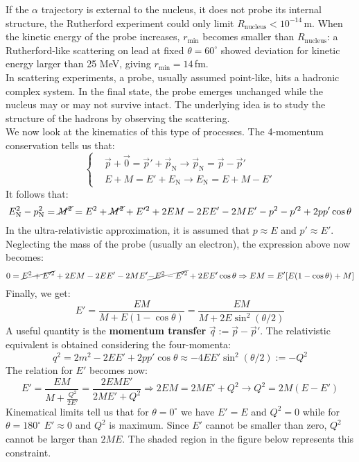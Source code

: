\documentclass[10.75pt,a4paper,openright,bottom=2cm]{article}
\begin{document}
If the $\alpha$ trajectory is external to the nucleus, it does not probe its internal structure, the Rutherford experiment could only limit $R_{\text{nucleus}}<10^{-14}$\,m. When the kinetic energy of the probe increases, $r_{\min}$ becomes smaller than $R_{\text{nucleus}}$: a Rutherford-like scattering on lead at fixed $\theta=60^\circ$ showed deviation for kinetic energy larger than 25 MeV, giving $r_{\min}=14$\,fm.\\
In scattering experiments, a probe, usually assumed point-like, hits a hadronic complex system. In the final state, the probe emerges unchanged while the nucleus may or may not survive intact. The underlying idea is to study the structure of the hadrons by observing the scattering.\\
We now look at the kinematics of this type of processes. The 4-momentum conservation tells us that:
\[
\left\{
\begin{aligned}
&\Vec{p}+\Vec{0}=\Vec{p}'+\Vec{p}_{\text{N}}\to\Vec{p}_{\text{N}}=\Vec{p}-\Vec{p}'\\
&E+M=E'+E_{\text{N}}\to E_{\text{N}}=E+M-E'
\end{aligned}
\right.
\]
It follows that:
\[
E_{\text{N}}^2-p_{\text{N}}^2=\cancel{M^2}=E^2+\cancel{M^2}+E'^2+2EM-2EE'-2ME'-p^2-p'^2+2pp'\cos\theta
\]
In the ultra-relativistic approximation, it is assumed that $p\approx E$ and $p'\approx E'$. Neglecting the mass of the probe (usually an electron), the expression above now becomes:
\[
0=\cancel{E^2+E'^2}+2EM-2EE'-2ME'\cancel{-E^2-E'^2}+2EE'\cos\theta\Rightarrow EM=E'[E(1-\cos\theta)+M]
\]
Finally, we get:
\[
E'=\frac{EM}{M+E(1-\cos\theta)}=\frac{EM}{M+2E\sin^2(\theta/2)}
\]
A useful quantity is the \textbf{momentum transfer} $\Vec{q}:=\Vec{p}-\Vec{p}'$. The relativistic equivalent is obtained considering the four-momenta:
\[
q^2=2m^2-2EE'+2pp'\cos\theta\approx-4EE'\sin^2(\theta/2):=-Q^2
\]
The relation for $E'$ becomes now:
\[
E'=\frac{EM}{M+\frac{Q^2}{2E'}}=\frac{2EME'}{2ME'+Q^2}\Rightarrow 2EM=2ME'+Q^2\to Q^2=2M(E-E')
\]
Kinematical limits tell us that for $\theta=0^\circ$ we have $E'=E$ and $Q^2=0$ while for $\theta=180^\circ$ $E'\approx0$ and $Q^2$ is maximum. Since $E'$ cannot be smaller than zero, $Q^2$ cannot be larger than $2ME$. The shaded region in the figure below represents this constraint.\\
\begin{center}
\end{center}
\end{document}
